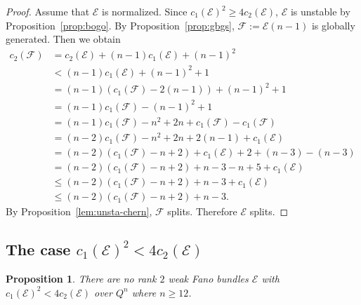 \documentclass{amsproc}
\newtheorem{proposition}[theorem]{Proposition}
\theoremstyle{definition}
\def\cE{{\mathcal E}}
\def\cF{{\mathcal F}}
\begin{document}
\begin{proof}
Assume that $\cE$ is normalized. Since $c_1(\cE)^2\ge 4c_2(\cE)$, $\cE$ is unstable by Proposition~\ref{prop:bogo}. By Proposition~\ref{prop:gbgs}, $\cF:=\cE(n-1)$ is globally generated. Then we obtain
\begin{align*}
c_2(\cF)&=c_2(\cE)+(n-1)c_1(\cE)+(n-1)^2\\
&< (n-1)c_1(\cE)+(n-1)^2+1\\
&=(n-1)(c_1(\cF)-2(n-1))+(n-1)^2+1\\
&=(n-1)c_1(\cF)-(n-1)^2+1\\
&=(n-1)c_1(\cF)-n^2+2n+c_1(\cF)-c_1(\cF)\\
&=(n-2)c_1(\cF)-n^2+2n+2(n-1)+c_1(\cE)\\
&=(n-2)(c_1(\cF)-n+2)+c_1(\cE)+2+(n-3)-(n-3)\\
&= (n-2)(c_1(\cF)-n+2)+n-3 -n+5+c_1(\cE)\\
&\le (n-2)(c_1(\cF)-n+2)+n-3 +c_1(\cE)\\
&\le (n-2)(c_1(\cF)-n+2)+n-3.
\end{align*}
By Proposition~\ref{lem:unsta-chern}, $\cF$ splits. Therefore $\cE$ splits.
\end{proof}

\subsection{The case $c_1(\cE)^2< 4c_2(\cE)$}

\begin{proposition}\label{prop:nexist}
There are no rank $2$ weak Fano bundles $\cE$ with $c_1(\cE)^2< 4c_2(\cE)$ over $Q^n$ where $n\ge 12$.
\end{proposition}
\end{document}
